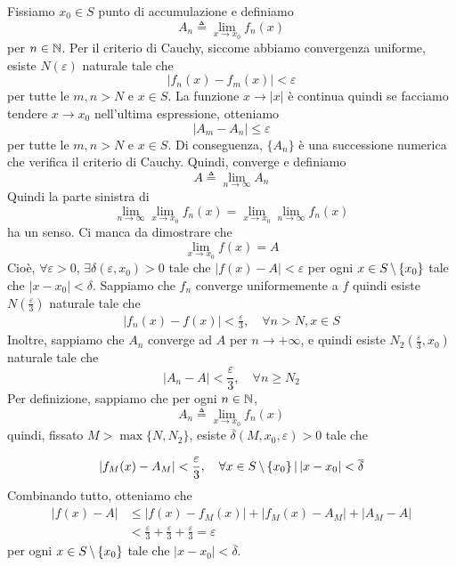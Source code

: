 \documentclass[a4paper]{article}
\begin{document}
\begin{radioactive}
\begin{snippetproof}{}
    Fissiamo \(x_0 \in S\) punto di accumulazione
    e definiamo \[ A_n \triangleq \lim_{x \to x_0} f_n(x) \] per \(n \in \mathbb{N}\).
    Per il criterio di Cauchy, siccome abbiamo convergenza uniforme,
    esiste \(N(\varepsilon)\) naturale tale che
    \[
        |f_n(x) - f_m(x)| < \varepsilon
    \]
    per tutte le \(m,n > N\) e \(x \in S\).
    La funzione \(x \to |x|\) è continua quindi se
    facciamo tendere \(x \to x_0\) nell'ultima espressione,
    otteniamo
    \[
        |A_m-A_n|\leq\varepsilon
    \]
    per tutte le \(m,n > N\) e \(x \in S\).
    Di conseguenza, \(\{A_n\}\) è una successione numerica che verifica il criterio di Cauchy.
    Quindi, converge e definiamo
    \[
        A \triangleq \lim_{n \to \infty} A_n
    \]
    Quindi la parte sinistra di
    \[
        \lim_{n \to \infty} \lim_{x \to x_0} f_n(x)
        = \lim_{x \to x_0} \lim_{n \to \infty} f_n(x)
    \]
    ha un senso. Ci manca da dimostrare che
    \[
        \lim_{x\to x_0} f(x) = A
    \]
    Cioè, \(\forall \varepsilon > 0\), \(\exists \delta(\varepsilon,x_0)>0\)
    tale che \(|f(x)-A|<\varepsilon\) per ogni \(x\in S \,\backslash\, \{x_0\}\) tale che \(|x-x_0| < \delta\).
    Sappiamo che \(f_n\) converge uniformemente a \(f\) quindi esiste \(N\left(\frac{\varepsilon}{3}\right)\)
    naturale tale che
    \begin{align*}
        |f_n(x) - f(x)| < \frac{\varepsilon}{3}, \quad \forall n > N, x \in S
    \end{align*}
    Inoltre, sappiamo che \(A_n\) converge ad \(A\) per \(n \to +\infty\),
    e quindi esiste \(N_2\left(\frac{\varepsilon}{3}, x_0\right)\) naturale tale che
    \[
        |A_n-A|<\frac{\varepsilon}{3}, \quad \forall n\geq N_2
    \]
    Per definizione, sappiamo che per ogni \(n \in \mathbb{N}\),
    \[
        A_n \triangleq \lim_{x\to x_0} f_n(x)
    \]
    quindi, fissato \(M>\max\{N,N_2\}\), esiste
    \(\overline\delta(M,x_0,\varepsilon)>0\) tale che

    \[
        |f_{M}(x) - A_{M}| < \frac{\varepsilon}{3},
        \quad \forall x \in S \,\backslash\, \{x_0\} \,|\, |x-x_0| < \overline\delta
    \]
    Combinando tutto, otteniamo che
    \begin{align*}
        |f(x) - A| &\leq |f(x) - f_{M}(x)| + |f_{M}(x) - A_{M}| + |A_{M} - A| \\
        &< \frac{\varepsilon}{3}+\frac{\varepsilon}{3}+\frac{\varepsilon}{3}=\varepsilon
    \end{align*}
    per ogni \(x\in S\,\backslash\,\{x_0\}\) tale che \(|x-x_0| < \overline\delta\).
\end{snippetproof}
\end{radioactive}
\end{document}
